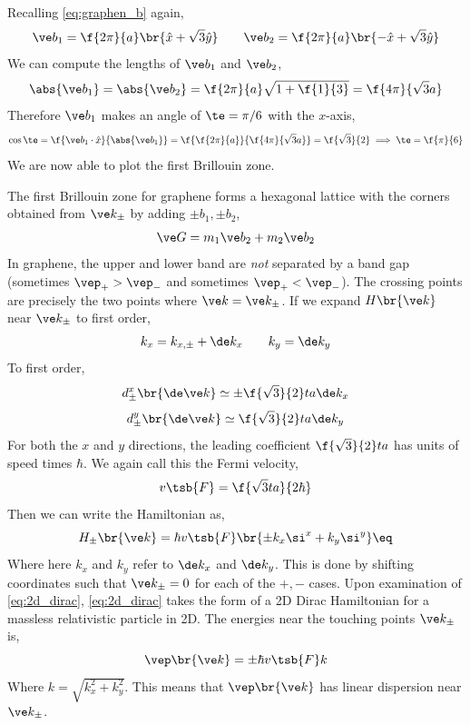 \documentclass{article}
\begin{document}
Recalling \cref{eq:graphen_b} again,
\[ \ve b_{1} = \f{2 \pi}{a} \br{\hat x + \sqrt{3} \hat y} \qquad \ve b_{2} = \f{2 \pi}{a} \br{-\hat x + \sqrt{3} \hat y}\]
We can compute the lengths of $\ve b_1$ and $\ve b_2$,
\[ \abs{\ve b_1} = \abs{\ve b_2} = \f{2 \pi}{a} \sqrt{1 + \f{1}{3}} = \f{4\pi}{\sqrt{3} a} \]
Therefore $\ve b_1$ makes an angle of $\te = \pi/6$ with the $x$-axis,
\[ \cos\te = \f{\ve b_1 \cdot \hat x}{\abs{\ve b_1}} = \f{\f{2 \pi}{a}}{\f{4 \pi}{\sqrt{3}a}} = \f{\sqrt{3}}{2} \implies \te = \f{\pi}{6} \]
We are now able to plot the first Brillouin zone.
\begin{center}
\end{center}
The first Brillouin zone for graphene forms a hexagonal lattice with the corners obtained from $\ve k_{\pm}$ by adding $\pm b_1, \pm b_2$,
\[ \ve G = m_1 \ve b_2 + m_2 \ve b_2 \]
In graphene, the upper and lower band are \textit{not} separated by a band gap (sometimes $\vep_{+} > \vep_{-}$ and sometimes $\vep_{+} < \vep_{-}$). The crossing points are precisely the two points where $\ve k = \ve k_{\pm}$. If we expand $H\br{\ve k}$ near $\ve k_{\pm}$ to first order,
\[ k_x = k_{x, \pm} + \de k_x  \qquad k_y = \de k_y\]
To first order,
\[ d^{x}_{\pm} \br{\de \ve k} \simeq \pm \f{\sqrt{3}}{2} t a \de k_x \]
\[ d^{y}_{\pm} \br{\de \ve k} \simeq \f{\sqrt{3}}{2} t a \de k_y \]
For both the $x$ and $y$ directions, the leading coefficient $\f{\sqrt{3}}{2} t a$ has units of speed times $\hbar$. We again call this the Fermi velocity,
\[ v\tsb{F} = \f{\sqrt{3} t a}{2\hbar} \]
Then we can write the Hamiltonian as,
\[ H_{\pm}\br{\ve k} = \hbar v\tsb{F} \br{\pm k_x \si^x + k_y \si^{y}} \eq \label{eq:2d_dirac}\]
Where here $k_x$ and $k_y$ refer to $\de k_x$ and $\de k_y$. This is done by shifting coordinates such that $\ve k_{\pm} = 0$ for each of the $+, -$ cases. Upon examination of \cref{eq:2d_dirac}, \cref{eq:2d_dirac} takes the form of a 2D Dirac Hamiltonian for a massless relativistic particle in 2D. The energies near the touching points $\ve k_{\pm}$ is,
\[ \vep\br{\ve k} = \pm \hbar v\tsb{F} k \]
Where $k = \sqrt{k_x^2 + k_y^2}$. This means that $\vep\br{\ve k}$ has linear dispersion near $\ve k_{\pm}$. \\
\end{document}
